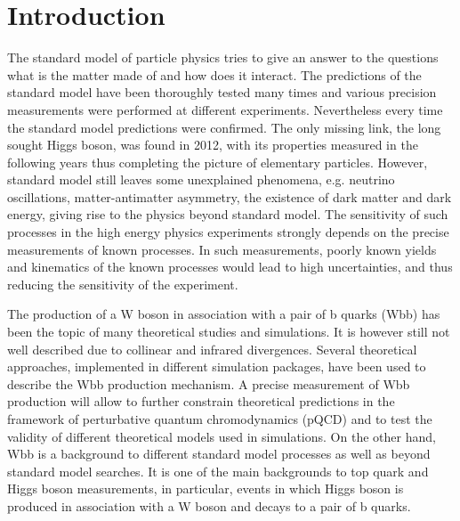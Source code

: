 
\chapter{Introduction} %

\label{Chapter1} %


The standard model of particle physics tries to give an answer to the questions what is the matter made of and how does it interact. The predictions of the standard model have been thoroughly tested many times and various precision measurements were performed at different experiments. Nevertheless every time the standard model predictions were confirmed. The only missing link, the long sought Higgs boson, was found in 2012, with its properties measured in the following years thus completing the picture of elementary particles. However, standard model still leaves some unexplained phenomena, e.g. neutrino oscillations, matter-antimatter asymmetry, the existence of dark matter and dark energy, giving rise to the physics beyond standard model. The sensitivity of such processes in the high energy physics experiments strongly depends on the precise measurements of known processes. In such measurements, poorly known yields and kinematics of the known processes would lead to high uncertainties, and thus reducing the sensitivity of the experiment. 
\par The production of a W boson in association with a pair of b quarks (Wbb) has
been the topic of many theoretical studies and simulations. It is however still not well described due to collinear and infrared divergences. Several theoretical
approaches, implemented in different simulation packages, have been used to describe the Wbb production mechanism. A precise measurement of Wbb production will allow to
further constrain theoretical predictions in the framework of perturbative quantum chromodynamics (pQCD) and to test the validity of different theoretical models used in simulations. On the other hand, Wbb is a background to different standard model processes as well as beyond standard model searches. It is one of the main backgrounds to top quark  and Higgs boson measurements, in particular, events in which Higgs boson is produced in association with a W boson and decays to a pair of b quarks.
